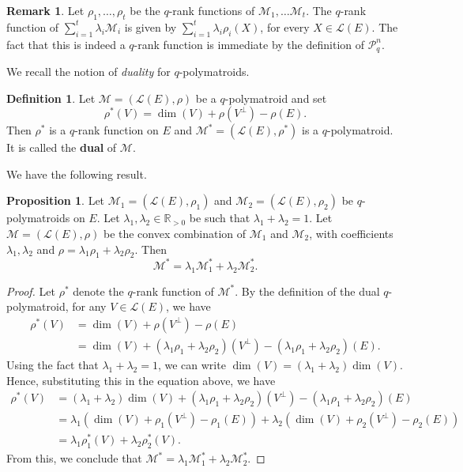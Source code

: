 \documentclass[a4paper,11pt,reqno]{amsart}
\theoremstyle{definition}
\newtheorem{definition}[theorem]{{{Definition}}}
\newtheorem{remark}[theorem]{{{Remark}}}
\newtheorem{proposition}[theorem]{{{Proposition}}}
\newcommand{\mM}{\mathcal{M}}
\newcommand{\mL}{\mathcal{L}}
\newcommand{\RP}{\mathcal{P}_q^n}
\begin{document}
{\begin{remark}
    Let $\rho_1,\ldots,\rho_t$ be the $q$-rank functions of $\mM_1,\ldots\mM_t$. The $q$-rank function of $\sum\limits_{i=1}^t\lambda_i\mM_i$ is given by $\sum\limits_{i=1}^t\lambda_i\rho_i(X)$, for every $X\in\mL(E)$. The fact that this is indeed a $q$-rank function is immediate by the definition of $\RP$. 
\end{remark}

We recall the notion of \emph{duality} for $q$-polymatroids. 
\begin{definition}
    Let $\mathcal{M} = (\mL(E), \rho)$ be a $q$-polymatroid and set 
    \begin{equation}
        \rho^*(V) = \dim(V) + \rho(V^{\perp}) - \rho(E).
    \end{equation}
    Then $\rho^*$ is a $q$-rank function on $E$ and $\mM^* = (\mL(E), \rho^*)$ is a $q$-polymatroid. It is called the \textbf{dual} of $\mM$.
\end{definition}
We have the following result. 
\begin{proposition}\label{prop:duality}
    Let $\mM_1 = (\mL(E), \rho_1)$ and $\mM_2 = (\mL(E), \rho_2)$ be $q$-polymatroids on $E$. Let $\lambda_1, \lambda_2 \in \mathbb{R}_{>0}$ be such that $\lambda_1 + \lambda_2 = 1$. Let $\mM = (\mL(E), \rho)$ be the convex combination of $
    \mM_1$ and $\mM_2$, with coefficients $\lambda_1,\lambda_2$ and $\rho = \lambda_1 \rho_1 + \lambda_2 \rho_2$. Then
    $$ \mM^* = \lambda_1 \mM_1^* + \lambda_2 \mM_2^*.$$
\end{proposition}
\begin{proof}
Let $\rho^*$ denote the $q$-rank function of $\mathcal{M}^*$. By the definition of the dual $q$-polymatroid, for any $V \in \mathcal{L}(E)$, we have
\begin{align*}
    \rho^*(V) &= \dim(V) +\rho(V^\perp)-\rho(E)\\
    &=\dim(V) +(\lambda_1\rho_1 + \lambda_2\rho_2)(V^\perp)-(\lambda_1\rho_1 + \lambda_2\rho_2)(E).
\end{align*}
Using the fact that $\lambda_1 + \lambda_2 = 1$, we can write $\dim(V) = (\lambda_1 + \lambda_2)\dim(V)$. Hence, substituting this in the equation above, we have
\begin{align*}
    \rho^*(V) &=(\lambda_1+\lambda_2)\dim(V) +(\lambda_1\rho_1 + \lambda_2\rho_2)(V^\perp)-(\lambda_1\rho_1 + \lambda_2\rho_2)(E)\\
    &=\lambda_1(\dim(V) + \rho_1(V^\perp) -\rho_1(E)) + \lambda_2(\dim(V) + \rho_2(V^\perp) -\rho_2(E)) \\
    &= \lambda_1\rho_1^*(V) + \lambda_2\rho_2^*(V).
\end{align*}
From this, we conclude that $\mM^* = \lambda_1\mM_1^* + \lambda_2\mM_2^*$.
\end{proof}


}
\end{document}
